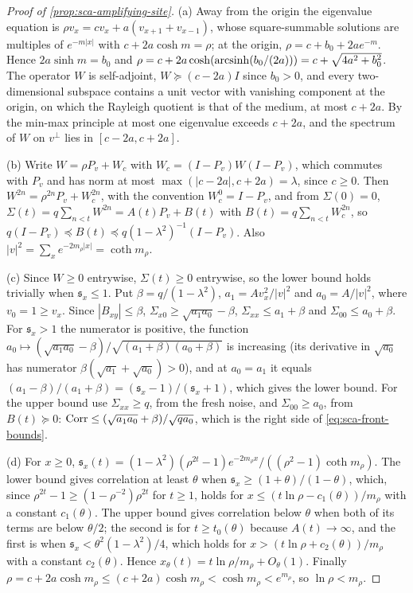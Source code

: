 \begin{proof}[Proof of \cref{prop:sca-amplifying-site}]
(a) Away from the origin the eigenvalue equation is $\rho v_x=cv_x+a(v_{x+1}+v_{x-1})$, whose square-summable solutions are multiples of $e^{-m|x|}$ with $c+2a\cosh m=\rho$; at the origin, $\rho=c+b_0+2ae^{-m}$. Hence $2a\sinh m=b_0$ and $\rho=c+2a\cosh(\operatorname{arcsinh}(b_0/(2a)))=c+\sqrt{4a^2+b_0^2}$. The operator $W$ is self-adjoint, $W\succeq(c-2a)I$ since $b_0>0$, and every two-dimensional subspace contains a unit vector with vanishing component at the origin, on which the Rayleigh quotient is that of the medium, at most $c+2a$. By the min-max principle at most one eigenvalue exceeds $c+2a$, and the spectrum of $W$ on $v^\perp$ lies in $[c-2a,c+2a]$.

(b) Write $W=\rho P_v+W_c$ with $W_c=(I-P_v)W(I-P_v)$, which commutes with $P_v$ and has norm at most $\max(|c-2a|,c+2a)=\lambda$, since $c\ge0$. Then $W^{2n}=\rho^{2n}P_v+W_c^{2n}$, with the convention $W_c^0=I-P_v$, and from $\Sigma(0)=0$, $\Sigma(t)=q\sum_{n<t}W^{2n}=A(t)P_v+B(t)$ with $B(t)=q\sum_{n<t}W_c^{2n}$, so $q(I-P_v)\preceq B(t)\preceq q(1-\lambda^2)^{-1}(I-P_v)$. Also $|v|^2=\sum_xe^{-2m_\rho|x|}=\coth m_\rho$.

(c) Since $W\ge0$ entrywise, $\Sigma(t)\ge0$ entrywise, so the lower bound holds trivially when $\mathfrak s_x\le1$. Put $\beta=q/(1-\lambda^2)$, $a_1=Av_x^2/|v|^2$ and $a_0=A/|v|^2$, where $v_0=1\ge v_x$. Since $|B_{xy}|\le\beta$, $\Sigma_{x0}\ge\sqrt{a_1a_0}-\beta$, $\Sigma_{xx}\le a_1+\beta$ and $\Sigma_{00}\le a_0+\beta$. For $\mathfrak s_x>1$ the numerator is positive, the function $a_0\mapsto(\sqrt{a_1a_0}-\beta)/\sqrt{(a_1+\beta)(a_0+\beta)}$ is increasing (its derivative in $\sqrt{a_0}$ has numerator $\beta(\sqrt{a_1}+\sqrt{a_0})>0$), and at $a_0=a_1$ it equals $(a_1-\beta)/(a_1+\beta)=(\mathfrak s_x-1)/(\mathfrak s_x+1)$, which gives the lower bound. For the upper bound use $\Sigma_{xx}\ge q$, from the fresh noise, and $\Sigma_{00}\ge a_0$, from $B(t)\succeq0$: $\operatorname{Corr}\le(\sqrt{a_1a_0}+\beta)/\sqrt{qa_0}$, which is the right side of \eqref{eq:sca-front-bounds}.

(d) For $x\ge0$, $\mathfrak s_x(t)=(1-\lambda^2)(\rho^{2t}-1)e^{-2m_\rho x}/((\rho^2-1)\coth m_\rho)$. The lower bound gives correlation at least $\theta$ when $\mathfrak s_x\ge(1+\theta)/(1-\theta)$, which, since $\rho^{2t}-1\ge(1-\rho^{-2})\rho^{2t}$ for $t\ge1$, holds for $x\le(t\ln\rho-c_1(\theta))/m_\rho$ with a constant $c_1(\theta)$. The upper bound gives correlation below $\theta$ when both of its terms are below $\theta/2$; the second is for $t\ge t_0(\theta)$ because $A(t)\to\infty$, and the first is when $\mathfrak s_x<\theta^2(1-\lambda^2)/4$, which holds for $x>(t\ln\rho+c_2(\theta))/m_\rho$ with a constant $c_2(\theta)$. Hence $x_\theta(t)=t\ln\rho/m_\rho+O_\theta(1)$. Finally $\rho=c+2a\cosh m_\rho\le(c+2a)\cosh m_\rho<\cosh m_\rho<e^{m_\rho}$, so $\ln\rho<m_\rho$.


\end{proof}
